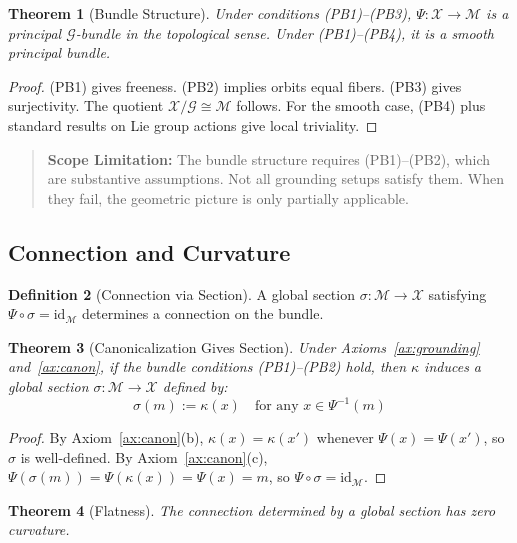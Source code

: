 \documentclass[12pt]{article}
\newtheorem{theorem}{Theorem}[section]
\theoremstyle{definition}
\newtheorem{definition}[theorem]{Definition}
\theoremstyle{remark}
\newcommand{\calX}{\mathcal{X}}
\newcommand{\calM}{\mathcal{M}}
\newcommand{\calG}{\mathcal{G}}
\begin{document}
\begin{theorem}[Bundle Structure]\label{thm:bundle}
Under conditions (PB1)--(PB3), $\Psi : \calX \to \calM$ is a principal
$\calG$-bundle in the topological sense. Under (PB1)--(PB4), it is a smooth principal bundle.
\end{theorem}

\begin{proof}
(PB1) gives freeness. (PB2) implies orbits equal fibers. (PB3) gives surjectivity. The
quotient $\calX/\calG \cong \calM$ follows. For the smooth case, (PB4) plus standard results on Lie group
actions give local triviality.
\end{proof}

\begin{quote}
\textbf{Scope Limitation:} The bundle structure requires (PB1)--(PB2), which are substantive
assumptions. Not all grounding setups satisfy them. When they fail, the geometric picture
is only partially applicable.
\end{quote}

\subsection{Connection and Curvature}

\begin{definition}[Connection via Section]\label{def:connection}
A global section $\sigma : \calM \to \calX$ satisfying $\Psi \circ \sigma = \mathrm{id}_\calM$
determines a connection on the bundle.
\end{definition}

\begin{theorem}[Canonicalization Gives Section]\label{thm:canon-section}
Under Axioms~\ref{ax:grounding} and~\ref{ax:canon}, if the bundle conditions
(PB1)--(PB2) hold, then $\kappa$ induces a global section $\sigma : \calM \to \calX$ defined by:
\[
    \sigma(m) := \kappa(x) \quad \text{for any } x \in \Psi^{-1}(m)
\]
\end{theorem}

\begin{proof}
By Axiom~\ref{ax:canon}(b), $\kappa(x) = \kappa(x')$ whenever $\Psi(x) = \Psi(x')$, so $\sigma$ is well-defined. By Axiom~\ref{ax:canon}(c), $\Psi(\sigma(m)) = \Psi(\kappa(x)) = \Psi(x) = m$, so $\Psi \circ \sigma = \mathrm{id}_\calM$.
\end{proof}

\begin{theorem}[Flatness]\label{thm:flatness}
The connection determined by a global section has zero curvature.
\end{theorem}
\end{document}
